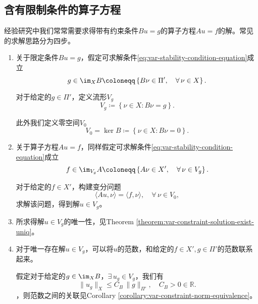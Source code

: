 \subsection{含有限制条件的算子方程}
\label{sec:var-constraints}
经验研究中我们常常需要求得带有约束条件$B u = g$的算子方程$A u = f$的解。常见的求解思路分为四步。
\begin{enumerate}
\item 关于限定条件$B u = g$，假定可求解条件\eqref{eq:var-stability-condition-equation}成立
\begin{equation*}
  g \in \im_{X} B \coloneqq \left\{ B \nu \in \Pi', \quad \forall \, \nu \in X \right\}.
\end{equation*}

对于给定的$g \in \Pi'$，定义流形$V_g$
\begin{equation*}
  V_g \coloneqq \left\{ \nu \in X : B \nu = g \right\}.
\end{equation*}

此外我们定义零空间$V_0$
\begin{equation*}
  V_0 = \ker B \coloneqq \left\{ \nu \in X: B \nu = 0 \right\}.
\end{equation*}

\item 关于算子方程$A u = f$，同样假定可求解条件\eqref{eq:var-stability-condition-equation}成立
\begin{equation*}
  f \in \im_{V_g} A \coloneqq \left\{ A \nu \in X', \quad \forall \, \nu \in V_g \right\}.
\end{equation*}

对于给定的$f \in X'$，构建变分问题
\begin{equation}
  \label{eq:var-constrain-variational-problem}
  \langle A u, \nu \rangle = \langle f, \nu \rangle, \quad \forall \, \nu \in V_0,
\end{equation}
求解该问题，得到解$u \in V_g$。

\item 所求得解$u \in V_g$的唯一性，见Theorem \ref{theorem:var-constraint-solution-exist-uniq}。

\item 对于唯一存在解$u \in V_g$，可以将$u$的范数，和给定的$f \in X', g \in \Pi'$的范数联系起来。

假定对于给定的$g \in \im_{X} B$，$\exists \, u_g \in V_g$，我们有
\begin{equation}
  \label{eq:var-constraint-norm-equivalence}
  \| u_g \|_{X} \le C_B \, \| g \|_{\Pi'}, \quad C_B > 0 \in \mathbb{R}.
\end{equation}
 ，则范数之间的关联见Corollary \ref{corollary:var-constraint-norm-equivalence}。
\end{enumerate}

